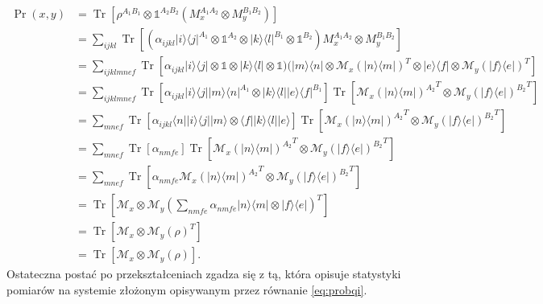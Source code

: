 \documentclass[10pt]{article} %
\DeclareMathOperator{\Trs}{Tr}
\newcommand{\Ket}[1]{|#1\rangle}
\newcommand{\Bra}[1]{\langle#1|}
\newcommand{\KP}{\Ket{\psi}}
\newcommand{\BP}{\Bra{\psi}}
\newcommand{\I}{\mathbb{1}}
\begin{document}
\begin{equation}
\begin{split}
\Pr(x,y) &= \Trs\left[\rho^{A_1B_1} \otimes \I^{A_2B_2}(M_x^{A_1A_2}\otimes M_y^{B_1B_2})\right]\\ &=\sum_{ijkl}\Trs\left[( \alpha_{ijkl} \Ket{i}\Bra{j}^{A_1} \otimes \I^{A_2} \otimes \Ket{k}\Bra{l}^{B_1} \otimes \I^{B_2}) M_x^{A_1A_2} \otimes M_y^{B_1B_2}\right] \\ 
&= \sum_{ijklmnef} \Trs \left[ \alpha_{ijkl} \Ket{i}\Bra{j} \otimes \I \otimes \Ket{k}\Bra{l} \otimes \I)(\Ket{m}\Bra{n} \otimes \mathcal{M}_x(\Ket{n}\Bra{m})^T \otimes \Ket{e}\Bra{f} \otimes \mathcal{M}_y(\Ket{f}\Bra{e})^T \right] \\
&= \sum_{ijklmnef} \Trs \left[ \alpha_{ijkl} \Ket{i}\Bra{j}\Ket{m}\Bra{n}^{A_1} \otimes \Ket{k}\Bra{l}\Ket{e}\Bra{f}^{B_1} \right] \Trs\left[{\mathcal{M}_x(\Ket{n}\Bra{m})^{A_2}}^T \otimes {\mathcal{M}_y(\Ket{f}\Bra{e})^{B_2}}^T\right] \\
&= \sum_{mnef} \Trs \left[ \alpha_{ijkl} \Bra{n}\Ket{i}\Bra{j}\Ket{m} \otimes \Bra{f}\Ket{k}\Bra{l}\Ket{e}\right]\Trs\left[{\mathcal{M}_x(\Ket{n}\Bra{m})^{A_2}}^T \otimes {\mathcal{M}_y(\Ket{f}\Bra{e})^{B_2}}^T\right] \\
&= \sum_{mnef} \Trs\left[\alpha_{nmfe} \right] \Trs\left[{\mathcal{M}_x(\Ket{n}\Bra{m})^{A_2}}^T \otimes {\mathcal{M}_y(\Ket{f}\Bra{e})^{B_2}}^T\right] \\
&= \sum_{mnef} \Trs\left[\alpha_{nmfe}{\mathcal{M}_x(\Ket{n}\Bra{m})^{A_2}}^T \otimes {\mathcal{M}_y(\Ket{f}\Bra{e})^{B_2}}^T\right] \\
&= \Trs \left[ \mathcal{M}_x \otimes \mathcal{M}_y(\sum_{nmfe}\alpha_{nmfe} \Ket{n}\Bra{m} \otimes \Ket{f}\Bra{e})^T\right] \\
&= \Trs \left[  \mathcal{M}_x \otimes \mathcal{M}_y(\rho)^T\right] \\
&= \Trs \left[ \mathcal{M}_x \otimes \mathcal{M}_y(\rho)\right].
\end{split}
\end{equation}
Ostateczna postać po przekształceniach zgadza się z tą, która opisuje statystyki pomiarów na systemie złożonym opisywanym przez równanie \eqref{eq:probqi}. 
\end{document}

